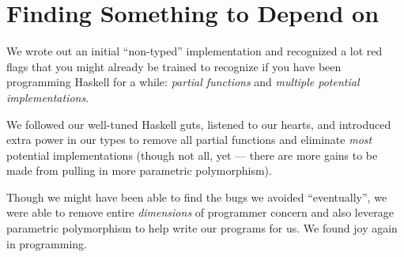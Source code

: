 \documentclass[]{article}
\newenvironment{Shaded}{}{}
\newcommand{\AttributeTok}[1]{\textcolor[rgb]{0.49,0.56,0.16}{#1}}
\newcommand{\CommentTok}[1]{\textcolor[rgb]{0.38,0.63,0.69}{\textit{#1}}}
\newcommand{\ExtensionTok}[1]{#1}
\newcommand{\NormalTok}[1]{#1}
\begin{document}
\begin{Shaded}
\end{Shaded}

\section{Finding Something to Depend on}\label{finding-something-to-depend-on}

We wrote out an initial ``non-typed'' implementation and recognized a lot red
flags that you might already be trained to recognize if you have been
programming Haskell for a while: \emph{partial functions} and \emph{multiple
potential implementations}.

We followed our well-tuned Haskell guts, listened to our hearts, and introduced
extra power in our types to remove all partial functions and eliminate
\emph{most} potential implementations (though not all, yet --- there are more
gains to be made from pulling in more parametric polymorphism).

Though we might have been able to find the bugs we avoided ``eventually'', we
were able to remove entire \emph{dimensions} of programmer concern and also
leverage parametric polymorphism to help write our programs for us. We found joy
again in programming.
\end{document}
